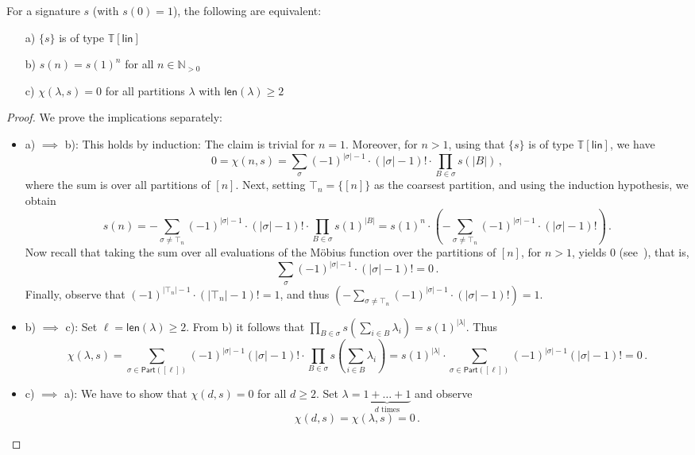 \documentclass[authorcolumns,numberwithinsect]{no-lipics-v2022}
\begin{document}
\begin{lemma}\label{lem:linear_type_sigs_equivalence}

For a signature $s$ (with $s(0)=1$), the following are equivalent:
\begin{enumerate}
    \item[a)] $\{s\}$ is of type $\mathbb{T}[\mathsf{lin}]$
    \item[b)] $s(n) = s(1)^n$ for all $n\in \mathbb{N}_{>0}$
    \item[c)] $\chi(\lambda, s)=0$ for all partitions $\lambda$ with $\mathsf{len}(\lambda) \geq 2$
\end{enumerate}
\end{lemma}
\begin{proof}
We prove the implications separately:
\begin{itemize}
    \item a) $\implies$ b): This holds by induction: The claim is trivial for $n=1$. Moreover, for $n>1$, using that $\{s\}$ is of type $\mathbb{T}[\mathsf{lin}]$, we have
    \[0 = \chi(n,s)= \sum_{\sigma} (-1)^{|\sigma|-1}\cdot (|\sigma|-1)! \cdot \prod_{B\in \sigma}s(|B|)\,,\]
    where the sum is over all partitions of $[n]$. Next, setting $\top_n=\{[n]\}$ as the coarsest partition, and using the induction hypothesis, we obtain
    \[ s(n)= - \sum_{\sigma \neq \top_n} (-1)^{|\sigma|-1}\cdot (|\sigma|-1)! \cdot \prod_{B\in \sigma}s(1)^{|B|} = s(1)^{n}\cdot (- \sum_{\sigma \neq \top_n} (-1)^{|\sigma|-1}\cdot (|\sigma|-1)!) \,.\]
    Now recall that taking the sum over all evaluations of the M\"obius function over the partitions of $[n]$, for $n>1$, yields $0$ (see~\cite[Chapter 3]{Stanley11}), that is,
    \[\sum_{\sigma} (-1)^{|\sigma|-1}\cdot (|\sigma|-1)! = 0\,.\]
    Finally, observe that $(-1)^{|\top_n|-1}\cdot (|\top_n|-1)! =1$, and thus
    $(- \sum_{\sigma \neq \top_n} (-1)^{|\sigma|-1}\cdot (|\sigma|-1)!) = 1$.
    \item  b) $\implies$ c): Set $\ell=\mathsf{len}(\lambda)\geq 2$. From b) it follows that $\prod_{B \in \sigma} s(\sum_{i \in B} \lambda_i) = s(1)^{|\lambda|}$. Thus
    \[\chi(\lambda , s) = \sum_{\sigma\in \mathsf{Part}([\ell])} (-1)^{|\sigma|-1} (|\sigma|-1)! \cdot \prod_{B \in \sigma} s(\sum_{i \in B} \lambda_i) = s(1)^{|\lambda|} \cdot  \sum_{\sigma\in \mathsf{Part}([\ell])} (-1)^{|\sigma|-1} (|\sigma|-1)! = 0\,.\]
    \item c) $\implies$ a): We have to show that $\chi(d,s)=0$ for all $d\geq 2$. Set $\lambda = \underbrace{ 1+\dots+1}_{d\text{ times}}$ and observe \[\chi(d,s)=\chi(\lambda,s)=0\,.\] 
\end{itemize}
\end{proof}
\end{document}
